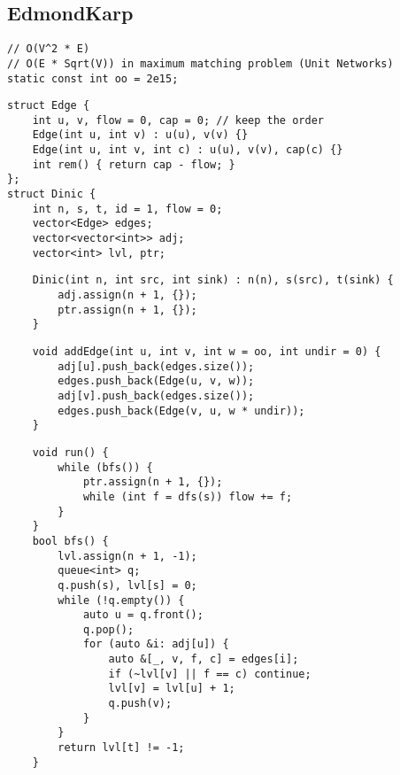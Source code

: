 \documentclass[twoside]{article}
\begin{document}
\begin{multicols*}{2}
{\subsection*{EdmondKarp}
}
\begin{verbatim}
// O(V^2 * E)
// O(E * Sqrt(V)) in maximum matching problem (Unit Networks)
static const int oo = 2e15;
\end{verbatim}
\vspace{-12pt}
\begin{verbatim}
struct Edge {
    int u, v, flow = 0, cap = 0; // keep the order
    Edge(int u, int v) : u(u), v(v) {}
    Edge(int u, int v, int c) : u(u), v(v), cap(c) {}
    int rem() { return cap - flow; }
};
struct Dinic {
    int n, s, t, id = 1, flow = 0;
    vector<Edge> edges;
    vector<vector<int>> adj;
    vector<int> lvl, ptr;
\end{verbatim}
\vspace{-12pt}
\begin{verbatim}
    Dinic(int n, int src, int sink) : n(n), s(src), t(sink) {
        adj.assign(n + 1, {});
        ptr.assign(n + 1, {});
    }
\end{verbatim}
\vspace{-12pt}
\begin{verbatim}
    void addEdge(int u, int v, int w = oo, int undir = 0) {
        adj[u].push_back(edges.size());
        edges.push_back(Edge(u, v, w));
        adj[v].push_back(edges.size());
        edges.push_back(Edge(v, u, w * undir));
    }
\end{verbatim}
\vspace{-12pt}
\begin{verbatim}
    void run() {
        while (bfs()) {
            ptr.assign(n + 1, {});
            while (int f = dfs(s)) flow += f;
        }
    }
    bool bfs() {
        lvl.assign(n + 1, -1);
        queue<int> q;
        q.push(s), lvl[s] = 0;
        while (!q.empty()) {
            auto u = q.front();
            q.pop();
            for (auto &i: adj[u]) {
                auto &[_, v, f, c] = edges[i];
                if (~lvl[v] || f == c) continue;
                lvl[v] = lvl[u] + 1;
                q.push(v);
            }
        }
        return lvl[t] != -1;
    }
\end{verbatim}
\vspace{-12pt}
\begin{verbatim}

\end{verbatim}
\end{multicols*}
\end{document}
